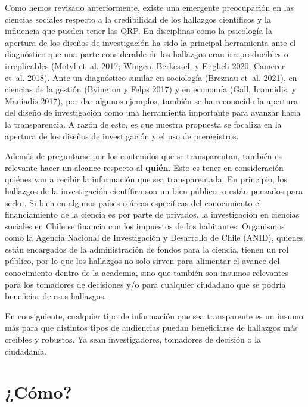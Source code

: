 \documentclass[
  spanish,
  letterpaper,
  DIV=11,
  numbers=noendperiod]{scrreprt}
\begin{document}
Como hemos revisado anteriormente, existe una emergente preocupación en
las ciencias sociales respecto a la credibilidad de los hallazgos
científicos y la influencia que pueden tener las QRP. En disciplinas
como la psicología la apertura de los diseños de investigación ha sido
la principal herramienta ante el diagnóstico que una parte considerable
de los hallazgos eran irreproducibles o irreplicables (Motyl et~al.
2017; Wingen, Berkessel, y Englich 2020; Camerer et~al. 2018). Ante un
diagnóstico similar en sociología (Breznau et~al. 2021), en ciencias de
la gestión (Byington y Felps 2017) y en economía (Gall, Ioannidis, y
Maniadis 2017), por dar algunos ejemplos, también se ha reconocido la
apertura del diseño de investigación como una herramienta importante
para avanzar hacia la transparencia. A razón de esto, es que nuestra
propuesta se focaliza en la apertura de los diseños de investigación y
el uso de preregistros.

Además de preguntarse por los contenidos que se transparentan, también
es relevante hacer un alcance respecto al \textbf{quién}. Esto es tener
en consideración quiénes van a recibir la información que sea
transparentada. En principio, los hallazgos de la investigación
científica son un bien público -o están pensados para serlo-. Si bien en
algunos países o áreas especificas del conocimiento el financiamiento de
la ciencia es por parte de privados, la investigación en ciencias
sociales en Chile se financia con los impuestos de los habitantes.
Organismos como la Agencia Nacional de Investigación y Desarrollo de
Chile (ANID), quienes están encargados de la administración de fondos
para la ciencia, tienen un rol público, por lo que los hallazgos no solo
sirven para alimentar el avance del conocimiento dentro de la academia,
sino que también son insumos relevantes para los tomadores de decisiones
y/o para cualquier ciudadano que se podría beneficiar de esos hallazgos.

En consiguiente, cualquier tipo de información que sea transparente es
un insumo más para que distintos tipos de audiencias puedan beneficiarse
de hallazgos más creíbles y robustos. Ya sean investigadores, tomadores
de decisión o la ciudadanía.

\section{¿Cómo?}\label{cuxf3mo}
\end{document}
